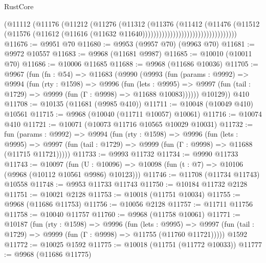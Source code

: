 \begin{lexlean}{RustCore}
\begin{coremodule}
                                              (@11112
                                                (@11176
                                                  (@11212
                                                    (@11276
                                                      (@11312
                                                        (@11376
                                                          (@11412
                                                            (@11476
                                                              (@11512
                                                                (@11576
                                                                  (@11612
                                                                    (@11616
                                                                      (@11632
                                                                        @11640))))))))))))))))))))))))))))))))))
@11676 := @9951 @70
@11680 := @9953 (@9957 @70) (@9963 @70)
@11681 := @9972 @10557
@11683 := @9968 (@11681 @9987)
@11685 := @10010 (@10011 @70)
@11686 := @10006 @11685
@11688 := @9968 (@11686 @10036)
@11705 := @9967
    (fun (fn : @54) =>
    @11683
      (@9990
        (@9993
          (fun (params : @9992) =>
          @9994
            (fun (rty : @1598) =>
            @9996
              (fun (lets : @9995) =>
              @9997 (fun (tail : @1729) => @9999 (fun (Γ : @9998) => @11688 @10083))))))
        @10129))
    @410
@11708 := @10135 (@11681 (@9985 @410))
@11711 := @10048 (@10049 @410) @10561
@11715 := @9968 (@10040 (@11711 @10057) @10061)
@11716 := @10074 @410
@11721 := @10071 (@10073 @11716 @10565 @10029 @10031)
@11732 := fun (params : @9992) =>
  @9994
    (fun (rty : @1598) =>
    @9996
      (fun (lets : @9995) =>
      @9997 (fun (tail : @1729) => @9999 (fun (Γ : @9998) => @11688 (@11715 @11721)))))
@11733 := @9993 @11732
@11734 := @9990 @11733
@11743 := @10097
    (fun (U : @10096) => @10098 (fun (t : @7) => @10106 (@9968 (@10112 @10561 @9986) @10123)))
@11746 := @11708 (@11734 @11743) @10558
@11748 := @9953 @11733 @11743
@11750 := @10184 @11732 @2128
@11751 := @10021 @2128
@11753 := @10018 (@11751 @10034)
@11755 := @9968 (@11686 @11753)
@11756 := @10056 @2128
@11757 := @11711 @11756
@11758 := @10040 @11757
@11760 := @9968 (@11758 @10061)
@11771 := @10187
    (fun (rty : @1598) =>
    @9996
      (fun (lets : @9995) =>
      @9997 (fun (tail : @1729) => @9999 (fun (Γ : @9998) => @11755 (@11760 @11721)))))
    @1592
@11772 := @10025 @1592
@11775 := @10018 (@11751 (@11772 @10033))
@11777 := @9968 (@11686 @11775)

\end{coremodule}
\end{lexlean}
